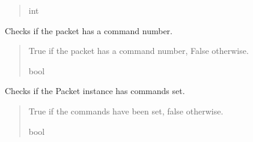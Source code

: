 \documentclass[letterpaper,10pt,english]{sphinxmanual}
\begin{document}
\begin{fulllineitems}
\begin{fulllineitems}
\begin{quote}
\begin{description}
\sphinxAtStartPar
int

\end{description}\end{quote}

\end{fulllineitems}


\begin{fulllineitems}
\label{\detokenize{Morelia.Packets:Morelia.Packets.Packet.Packet.HasCommandNumber}}
\pysigstartsignatures
{}
\pysigstopsignatures
\sphinxAtStartPar
Checks if the packet has a command number.
\begin{quote}\begin{description}
\sphinxAtStartPar
True if the packet has a command number, False otherwise.

\sphinxAtStartPar
bool

\end{description}\end{quote}

\end{fulllineitems}


\begin{fulllineitems}
\label{\detokenize{Morelia.Packets:Morelia.Packets.Packet.Packet.HasCommands}}
\pysigstartsignatures
{}
\pysigstopsignatures
\sphinxAtStartPar
Checks if the Packet instance has commands set.
\begin{quote}\begin{description}
\sphinxAtStartPar
True if the commands have been set, false otherwise.

\sphinxAtStartPar
bool

\end{description}\end{quote}

\end{fulllineitems}


\end{fulllineitems}
\end{document}
